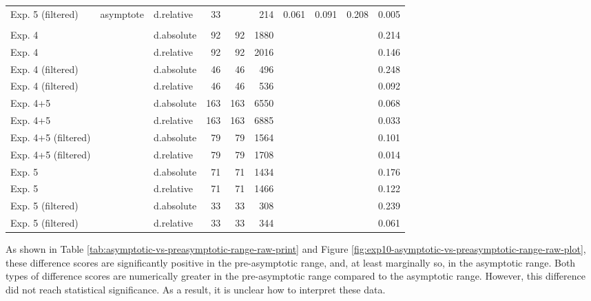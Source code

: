 \documentclass[
]{article}
\begin{document}
\begin{table}
{\begin{tabular}[t]{lllrrrrrrl}
\hspace{1em}Exp. 5 (filtered) & asymptote & d.relative & 33 &  & 214 & 0.061 & 0.091 & 0.208 & 0.005\\
\addlinespace[0.3em]
\multicolumn{10}{l}{\textbf{Difference scores comparison across ratio ranges}}\\
\hspace{1em}Exp. 4 &  & d.absolute & 92 & 92 & 1880 &  &  &  & 0.214\\
\hspace{1em}Exp. 4 &  & d.relative & 92 & 92 & 2016 &  &  &  & 0.146\\
\hspace{1em}Exp. 4 (filtered) &  & d.absolute & 46 & 46 & 496 &  &  &  & 0.248\\
\hspace{1em}Exp. 4 (filtered) &  & d.relative & 46 & 46 & 536 &  &  &  & 0.092\\
\hspace{1em}Exp. 4+5 &  & d.absolute & 163 & 163 & 6550 &  &  &  & 0.068\\
\hspace{1em}Exp. 4+5 &  & d.relative & 163 & 163 & 6885 &  &  &  & 0.033\\
\hspace{1em}Exp. 4+5 (filtered) &  & d.absolute & 79 & 79 & 1564 &  &  &  & 0.101\\
\hspace{1em}Exp. 4+5 (filtered) &  & d.relative & 79 & 79 & 1708 &  &  &  & 0.014\\
\hspace{1em}Exp. 5 &  & d.absolute & 71 & 71 & 1434 &  &  &  & 0.176\\
\hspace{1em}Exp. 5 &  & d.relative & 71 & 71 & 1466 &  &  &  & 0.122\\
\hspace{1em}Exp. 5 (filtered) &  & d.absolute & 33 & 33 & 308 &  &  &  & 0.239\\
\hspace{1em}Exp. 5 (filtered) &  & d.relative & 33 & 33 & 344 &  &  &  & 0.061\\
\bottomrule
\end{tabular}}
\end{table}

As shown in Table \ref{tab:asymptotic-vs-preasymptotic-range-raw-print} and Figure \ref{fig:exp10-asymptotic-vs-preasymptotic-range-raw-plot}, these difference scores are significantly positive in the pre-asymptotic range, and, at least marginally so, in the asymptotic range. Both types of difference scores are numerically greater in the pre-asymptotic range compared to the asymptotic range. However, this difference did not reach statistical significance. As a result, it is unclear how to interpret these data.
\end{document}
